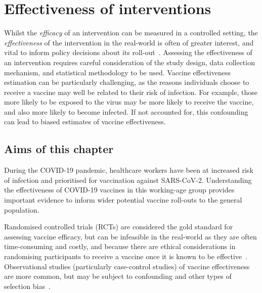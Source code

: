 \chapter{Effectiveness of interventions}\label{cha:siren}

\graphicspath{{04_SIREN/Figs/}}

Whilst the \textit{efficacy} of an intervention can be measured in a controlled setting, the \textit{effectiveness} of the intervention in the real-world is often of greater interest, and vital to inform policy decisions about its roll-out~\parencite{Ortiz2022-kx}. Assessing the effectiveness of an intervention requires careful consideration of the study design, data collection mechanism, and statistical methodology to be used. Vaccine effectiveness estimation can be particularly challenging, as the reasons individuals choose to receive a vaccine may well be related to their risk of infection. For example, those more likely to be exposed to the virus may be more likely to receive the vaccine, and also more likely to become infected. If not accounted for, this confounding can lead to biased estimates of vaccine effectiveness.

\section{Aims of this chapter}

During the COVID-19 pandemic, healthcare workers have been at increased risk of infection and prioritised for vaccination against SARS-CoV-2. Understanding the effectiveness of COVID-19 vaccines in this working-age group provides important evidence to inform wider potential vaccine roll-outs to the general population.

Randomised controlled trials (RCTs) are considered the gold standard for assessing vaccine efficacy, but can be infeasible in the real-world as they are often time-consuming and costly, and because there are ethical considerations in randomising participants to receive a vaccine once it is known to be effective~\parencite{Ottoboni2020-if, Stoehr2021-tw}. Observational studies (particularly case-control studies) of vaccine effectiveness are more common, but may be subject to confounding and other types of selection bias~\parencite{Shi2023-ic, Sullivan2016-io}.

